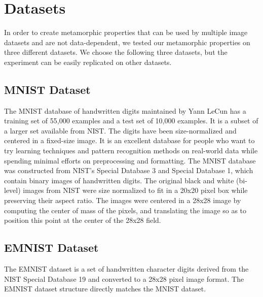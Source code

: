 \section{Datasets}\label{dataset}
In order to create metamorphic properties that can be used by multiple image datasets and are not data-dependent, we tested our metamorphic properties on three different datasets. We choose the following three datasets, but the experiment can be easily replicated on other datasets.

\subsection{MNIST Dataset}
The MNIST database of handwritten digits maintained by Yann LeCun \cite{MNIST} has a training set of 55,000 examples and a test set of 10,000 examples. It is a subset of a larger set available from NIST. The digits have been size-normalized and centered in a fixed-size image. It is an excellent database for people who want to try learning techniques and pattern recognition methods on real-world data while spending minimal efforts on preprocessing and formatting. The MNIST database was constructed from NIST's Special Database 3 and Special Database 1, which contain binary images of handwritten digits. The original black and white (bi-level) images from NIST were size normalized to fit in a 20x20 pixel box while preserving their aspect ratio. The images were centered in a 28x28 image by computing the center of mass of the pixels, and translating the image so as to position this point at the center of the 28x28 field.

\subsection{EMNIST Dataset}
The EMNIST dataset is a set of handwritten character digits derived from the NIST Special Database 19
and converted to a 28x28 pixel image format. The EMNIST dataset structure directly matches the MNIST dataset.


